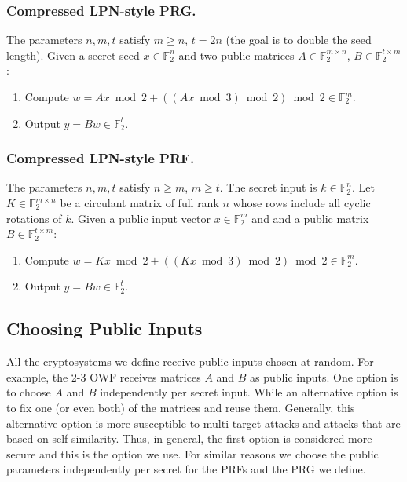 \documentclass[orivec,envcountsect]{llncs}
\begin{document}
\subsubsection{Compressed LPN-style PRG.}

The parameters $n,m,t$ satisfy $m \geq n$, $t = 2n$ (the goal is to double the seed length).
Given a secret seed $x \in \mathbb{F}_2^n$ and
two public matrices $A \in \mathbb{F}_2^{m \times n}$,
$B \in \mathbb{F}_2^{t \times m}$:
\begin{enumerate}
  \item Compute $w = Ax \bmod 2 + ((Ax \bmod 3) \bmod 2) \bmod 2 \in \mathbb{F}_2^m$.
  \item Output $y = Bw \in \mathbb{F}_2^t$.
\end{enumerate}

\subsubsection{Compressed LPN-style PRF.}

The parameters $n,m,t$ satisfy $n \geq m$, $m \geq t$.
The secret input is $k \in \mathbb{F}_2^{n}$.
Let $K \in \mathbb{F}_2^{m \times n}$ be a circulant matrix of full rank $n$
whose rows include all cyclic rotations of $k$.
Given a public input vector $x \in \mathbb{F}^{m}_2$ and
and a public matrix $B \in \mathbb{F}_2^{t \times m}$:
\begin{enumerate}
  \item Compute $w = Kx \bmod 2 + ((Kx \bmod 3) \bmod 2) \bmod 2 \in \mathbb{F}_2^m$.
  \item Output $y = Bw \in \mathbb{F}_2^t$.
\end{enumerate}

\subsection{Choosing Public Inputs}

All the cryptosystems we define receive public inputs chosen at random.
For example, the 2-3 OWF receives matrices $A$ and $B$ as public inputs.
One option is to choose $A$ and $B$ independently per secret input.
While an alternative option is to fix one (or even both) of the matrices and reuse them.
Generally, this alternative option is more susceptible to multi-target
attacks and attacks that are based on self-similarity.
Thus, in general, the first option is considered more secure and this is the option we use.
For similar reasons we choose the public parameters independently per secret for the
PRFs and the PRG we define.
\end{document}
